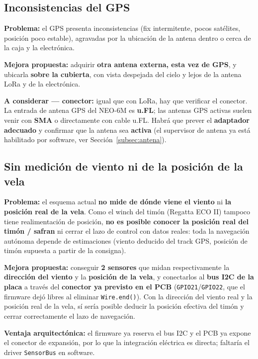 \documentclass[12pt,a4paper]{article}
\newcommand{\gpio}[1]{\texttt{GPIO#1}}
\newcommand{\file}[1]{\texttt{#1}}
\begin{document}
\subsection{Inconsistencias del GPS}

\begin{warningbox}
  \textbf{Problema:} el GPS presenta inconsistencias (fix intermitente,
  pocos sat\'elites, posici\'on poco estable), agravadas por la ubicaci\'on de la
  antena dentro o cerca de la caja y la electr\'onica.
\end{warningbox}

\begin{okbox}
  \textbf{Mejora propuesta:} adquirir \textbf{otra antena externa, esta vez de
  GPS}, y ubicarla \textbf{sobre la cubierta}, con vista despejada del cielo y lejos
  de la antena LoRa y de la electr\'onica.

  \textbf{A considerar --- conector:} igual que con LoRa, hay que verificar el
  conector. La entrada de antena GPS del NEO-6M es \textbf{u.FL}; las antenas GPS
  activas suelen venir con \textbf{SMA} o directamente con cable u.FL. Habr\'a que
  prever el \textbf{adaptador adecuado} y confirmar que la antena sea
  \textbf{activa} (el supervisor de antena ya est\'a habilitado por software, ver
  Secci\'on~\ref{subsec:antena}).
\end{okbox}

\subsection{Sin medici\'on de viento ni de la posici\'on de la vela}

\begin{warningbox}
  \textbf{Problema:} el esquema actual \textbf{no mide de d\'onde viene el viento}
  ni \textbf{la posici\'on real de la vela}. Como el winch del tim\'on (Regatta ECO
  II) tampoco tiene realimentaci\'on de posici\'on, \textbf{no es posible conocer la
  posici\'on real del tim\'on / safran} ni cerrar el lazo de control con datos
  reales: toda la navegaci\'on aut\'onoma depende de estimaciones (viento deducido
  del track GPS, posici\'on de tim\'on supuesta a partir de la consigna).
\end{warningbox}

\begin{okbox}
  \textbf{Mejora propuesta:} conseguir \textbf{2 sensores} que midan
  respectivamente la \textbf{direcci\'on del viento} y la \textbf{posici\'on de la
  vela}, y conectarlos al \textbf{bus I2C de la placa} a trav\'es del
  \textbf{conector ya previsto en el PCB} (\gpio{21}/\gpio{22}, que el firmware
  dej\'o libres al eliminar \texttt{Wire.end()}). Con la direcci\'on del viento real
  y la posici\'on real de la vela, s\'i ser\'ia posible deducir la posici\'on
  efectiva del tim\'on y cerrar correctamente el lazo de navegaci\'on.

  \textbf{Ventaja arquitect\'onica:} el firmware ya reserva el bus I2C y el PCB ya
  expone el conector de expansi\'on, por lo que la integraci\'on el\'ectrica es
  directa; faltar\'ia el driver \file{SensorBus} en software.
\end{okbox}
\end{document}
